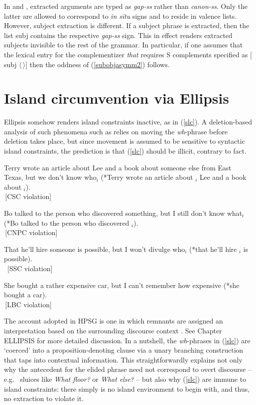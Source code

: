 \documentclass[output=paper]{langsci/langscibook}
\begin{document}

\noindent
In \citet{bouma} and \citet{ginzsag}, extracted arguments are typed as {\it gap-ss} rather than {\it canon-ss}. Only the latter are allowed to correspond to {\it in situ} signs and to reside in valence lists. However, subject extraction is different. If a subject phrase is extracted, then the list {\sc subj} contains the respective {\it gap-ss} sign. This in effect renders extracted subjects invisible to the rest of the grammar.
In particular, if one assumes that the lexical entry for the complementizer {\it that} requires 
S complements specified as $[${\sc subj} $\langle \, \rangle]$ then the oddness of 
(\ref{subobjasymm2}) follows.


\section{Island circumvention via Ellipsis}

Ellipsis somehow renders island  constraints inactive, as in (\ref{slc}). A deletion-based analysis of such phenomena such as  \citet{merchantbook}  relies on moving the {\it wh}-phrase before deletion takes place, but since  movement is assumed to be sensitive to syntactic island constraints, the  prediction is that (\ref{slc}) should be illicit, contrary to fact. 

\ea
\ea Terry wrote an article about Lee and a book about someone else from
East Texas, but we don't know who$_i$ (*Terry wrote an article about \spc$_i$ Lee
and a book about \spc$_i$).\\
 \,[CSC violation]

\ex Bo talked to the person who discovered something, but I still don't know
what$_i$ (*Bo talked to the person who discovered \spc$_i$). \\
\,[CNPC violation]

\ex That he'll hire someone is possible, but I won't divulge who$_i$
(*that he'll  hire \spc$_i$ is possible).\\
\, [SSC violation]

\ex  She bought a rather expensive car, but I can't remember how expensive
(*she bought a \spcs car). \\
\,[LBC violation]
\z \label{slc}
\z

The  account adopted in HPSG is one in which remnants  are assigned an interpretation based on the surrounding discourse context  \citep{ginzsag,Culicover:Jackendoff:05,jacobson08,sagn}. 
See Chapter ELLIPSIS for more detailed discussion. In a nutshell,  the {\it wh}-phrases in (\ref{slc}) are `coerced' into a proposition-denoting clause via a unary branching construction that taps into contextual information.  This straightforwardly explains not only why the antecedent for the elided phrase need not correspond to  overt discourse --  e.g. \ sluices like \emph{What floor?} or \emph{What else?} --
but also  why (\ref{slc})  are immune to island constraints: there simply is no island
 environment to begin with, and thus, no extraction to violate it.
\end{document}
